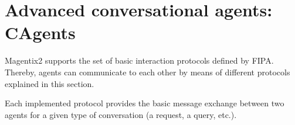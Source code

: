 


\chapter{Advanced conversational agents: CAgents}\label{sec:CAgents}

Magentix2  supports the set of basic interaction protocols defined by FIPA. Thereby, agents can communicate to each other by means of different protocols explained in this section.

Each implemented protocol provides the basic message exchange between two agents for a given type of conversation (a request, a query, etc.). %



